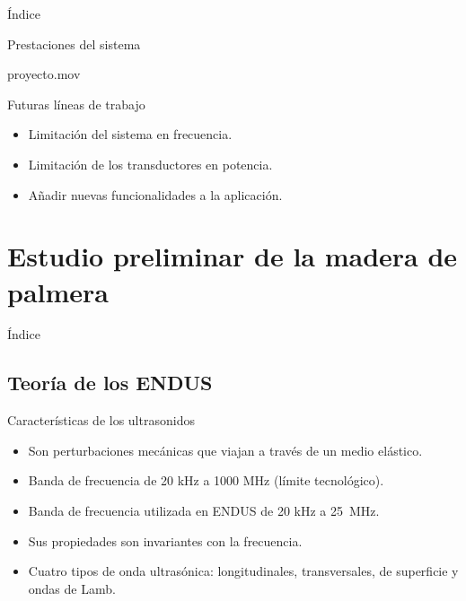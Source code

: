 \documentclass[utf8, compress]			{beamer}
\begin{document}
\begin{frame}{Índice}
    \tableofcontents[currentsubsection]
\end{frame}

\begin{frame}{Prestaciones del sistema}
    \begin{center}
	    {proyecto.mov}
    \end{center}
\end{frame}

\begin{frame}{Futuras líneas de trabajo}
    \begin{itemize}
	\item Limitación del sistema en frecuencia.
	\item Limitación de los transductores en potencia.
	\item Añadir nuevas funcionalidades a la aplicación.
    \end{itemize}
\end{frame}


\section{Estudio preliminar de la madera de palmera}

\begin{frame}{Índice}
    \tableofcontents[currentsection]
\end{frame}


\subsection{Teoría de los ENDUS}

\begin{frame}{Características de los ultrasonidos}
    \begin{itemize}
	\item Son perturbaciones mecánicas que viajan a través de un medio
	    elástico.
	\item Banda de frecuencia de 20 kHz a 1000 MHz (límite
	    tecnológico).
	\item Banda de frecuencia utilizada en ENDUS de 20 kHz a 25~MHz.
	\item Sus propiedades son invariantes con la frecuencia.
	\item Cuatro tipos de onda ultrasónica: longitudinales,
	    transversales, de superficie y ondas de Lamb.
    \end{itemize}
\end{frame}
\end{document}
